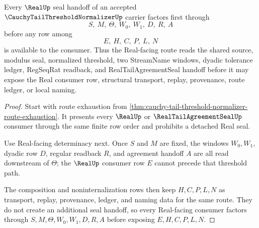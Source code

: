 \begin{theorem}
\label{thm:cauchy-tail-threshold-normalizer-real-seal-handoff}
Every $\RealUp$ seal handoff of an accepted $\CauchyTailThresholdNormalizerUp$ carrier factors first through
$$
S,\ M,\ \Theta,\ W_0,\ W_1,\ D,\ R,\ A
$$
before any row among
$$
E,\ H,\ C,\ P,\ L,\ N
$$
is available to the consumer. Thus the Real-facing route reads the shared source, modulus seal, normalized threshold, two StreamName windows, dyadic tolerance ledger, RegSeqRat readback, and RealTailAgreementSeal handoff before it may expose the Real consumer row, structural transport, replay, provenance, route ledger, or local naming.
\end{theorem}
\begin{proof}
Start with route exhaustion from \autoref{thm:cauchy-tail-threshold-normalizer-route-exhaustion}. It presents every $\RealUp$ or $\RealTailAgreementSealUp$ consumer through the same finite row order and prohibits a detached Real seal.

Use Real-facing determinacy next. Once $S$ and $M$ are fixed, the windows $W_0,W_1$, dyadic row $D$, regular readback $R$, and agreement handoff $A$ are all read downstream of $\Theta$; the $\RealUp$ consumer row $E$ cannot precede that threshold path.

The composition and noninternalization rows then keep $H,C,P,L,N$ as transport, replay, provenance, ledger, and naming data for the same route. They do not create an additional seal handoff, so every Real-facing consumer factors through $S,M,\Theta,W_0,W_1,D,R,A$ before exposing $E,H,C,P,L,N$.
\end{proof}

